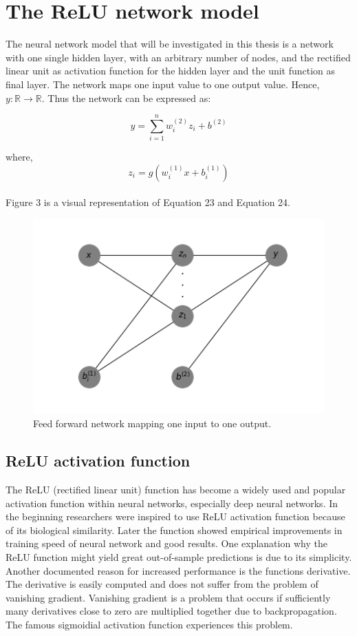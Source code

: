 \documentclass[11pt, letterpaper]{amsart}
\begin{document}
\newpage

\section{The ReLU network model}
The neural network model that will be investigated in this thesis is a network with one single hidden layer, with an arbitrary number of nodes, and the rectified linear unit as activation function for the hidden layer and the unit function as final layer. The network maps one input value to one output value. Hence, $y: \mathbb{R} \rightarrow \mathbb{R}$. Thus the network can be expressed as:

\begin{equation}
    y = \sum_{i=1}^n w_i^{(2)} z_i + b^{(2)}
\end{equation}

where,
\begin{equation}
    z_i = g(w_i^{(1)}x + b_i^{(1)})
\end{equation}
\\

Figure 3 is a visual representation of Equation 23 and Equation 24.

\begin{figure}[H]
\caption{Feed forward network mapping one input to one output.}
\centering
\includegraphics[scale=0.7]{Network2.png}
\end{figure}


\subsection{ReLU activation function}
The ReLU (rectified linear unit) function has become a widely used and popular activation function within neural networks, especially deep neural networks. In the beginning researchers were inspired to use ReLU activation function because of its biological similarity. Later the function showed empirical improvements in training speed of neural network and good results. One explanation why the ReLU function might yield great out-of-sample predictions is due to its simplicity. Another documented reason for increased performance is the functions derivative. The derivative is easily computed and does not suffer from the problem of vanishing gradient. Vanishing gradient is a problem that occurs if sufficiently many derivatives close to zero are multiplied together due to backpropagation. The famous sigmoidial activation function experiences this problem.
\\
\end{document}

